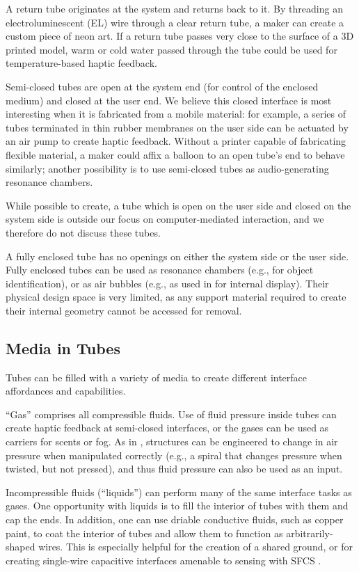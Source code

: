 A return tube originates at the system and returns back to it.  By threading an electroluminescent (EL) wire through a clear return tube, a maker can create a custom piece of neon art.  If a return tube passes very close to the surface of a 3D printed model, warm or cold water passed through the tube could be used for temperature-based haptic feedback.

Semi-closed tubes are open at the system end (for control of the enclosed medium) and closed at the user end.  We believe this closed interface is most interesting when it is fabricated from a mobile material: for example, a series of tubes terminated in thin rubber membranes on the user side can be actuated by an air pump to create haptic feedback.  Without a printer capable of fabricating flexible material, a maker could affix a balloon to an open tube's end to behave similarly; another possibility is to use semi-closed tubes as audio-generating resonance chambers.

While possible to create, a tube which is open on the user side and closed on the system side is outside our focus on computer-mediated interaction, and we therefore do not discuss these tubes.

A fully enclosed tube has no openings on either the system side or the user side.  Fully enclosed tubes can be used as resonance chambers (e.g., for object identification), or as air bubbles (e.g., as used in \cite{Willis-printedoptics} for internal display).  Their physical design space is very limited, as any support material required to create their internal geometry cannot be accessed for removal.

\subsection{Media in Tubes}

Tubes can be filled with a variety of media to create different interface affordances and capabilities.

``Gas'' comprises all compressible fluids.  Use of fluid pressure inside tubes can create haptic feedback at semi-closed interfaces, or the gases can be used as carriers for scents or fog.  As in \cite{Slyper-pressure}, structures can be engineered to change in air pressure when manipulated correctly (e.g., a spiral that changes pressure when twisted, but not pressed), and thus fluid pressure can also be used as an input.

Incompressible fluids (``liquids'') can perform many of the same interface tasks as gases.  One opportunity with liquids is to fill the interior of tubes with them and cap the ends.  In addition, one can use driable conductive fluids, such as copper paint, to coat the interior of tubes and allow them to function as arbitrarily-shaped wires.  This is especially helpful for the creation of a shared ground, or for creating single-wire capacitive interfaces amenable to sensing with SFCS \cite{Sato-touche}.

